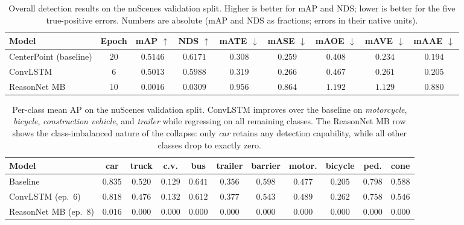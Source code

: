 \documentclass[12pt,a4paper]{report}
\begin{document}
\begin{table}[h]
\centering
\caption{Overall detection results on the nuScenes validation
split. Higher is better for mAP and NDS; lower is better for the
five true-positive errors. Numbers are absolute (mAP and NDS as
fractions; errors in their native units).}
\label{tab:overall}
\small
\begin{tabular}{lcccccccc}
\hline
Model & Epoch & mAP $\uparrow$ & NDS $\uparrow$ &
mATE $\downarrow$ & mASE $\downarrow$ & mAOE $\downarrow$ &
mAVE $\downarrow$ & mAAE $\downarrow$ \\
\hline
CenterPoint (baseline) &
$20$ & $0.5146$ & $0.6171$ &
$0.308$ & $0.259$ & $0.408$ & $0.234$ & $0.194$ \\
ConvLSTM &
$6$  & $0.5013$ & $0.5988$ &
$0.319$ & $0.266$ & $0.467$ & $0.261$ & $0.205$ \\
ReasonNet MB &
$10$  & $0.0016$ & $0.0309$ &
$0.956$ & $0.864$ & $1.192$ & $1.129$ & $0.880$ \\
\hline
\end{tabular}
\end{table}

\begin{table}[h]
\centering
\caption{Per-class mean AP on the nuScenes validation split.
ConvLSTM improves over the baseline on \emph{motorcycle},
\emph{bicycle}, \emph{construction vehicle}, and \emph{trailer}
while regressing on all remaining classes. The ReasonNet MB row
shows the class-imbalanced nature of the collapse: only
\emph{car} retains any detection capability, while all other
classes drop to exactly zero.}
\label{tab:perclass}
\small
\setlength{\tabcolsep}{4pt}
\begin{tabular}{lcccccccccc}
\hline
Model &
car & truck & c.v. & bus & trailer &
barrier & motor. & bicycle & ped. & cone \\
\hline
Baseline &
$0.835$ & $0.520$ & $0.129$ & $0.641$ & $0.356$ &
$0.598$ & $0.477$ & $0.205$ & $0.798$ & $0.588$ \\
ConvLSTM (ep.\ 6) &
$0.818$ & $0.476$ & $0.132$ & $0.612$ & $0.377$ &
$0.543$ & $0.489$ & $0.262$ & $0.758$ & $0.546$ \\
ReasonNet MB (ep.\ 8) &
$0.016$ & $0.000$ & $0.000$ & $0.000$ & $0.000$ &
$0.000$ & $0.000$ & $0.000$ & $0.000$ & $0.000$ \\
\hline
\end{tabular}
\end{table}
\end{document}
